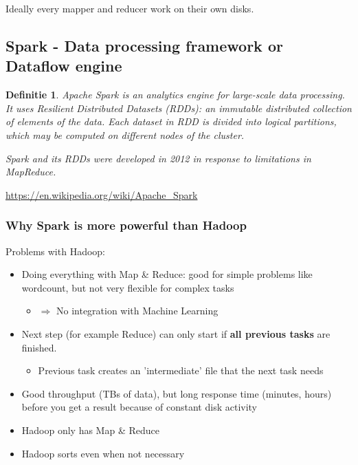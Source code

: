 \documentclass{article}
\newtheorem{theorem}{Definitie}[section]
\begin{document}
Ideally every mapper and reducer work on their own disks.

\subsection{Spark - Data processing framework or Dataflow engine}

\begin{theorem}
    Apache Spark is an analytics engine for large-scale data processing. 
    It uses Resilient Distributed Datasets (RDDs): an immutable
    distributed collection of elements of the data. 
    Each dataset in RDD is divided into logical partitions, 
    which may be computed on different nodes of the cluster.
    
    Spark and its RDDs were developed in 2012 in response to limitations in MapReduce.
\end{theorem}

\url{https://en.wikipedia.org/wiki/Apache_Spark}

\subsubsection{Why Spark is more powerful than Hadoop}

Problems with Hadoop:

\begin{itemize}
    \item Doing everything with Map \& Reduce: good for simple problems like wordcount, but not very flexible for complex tasks
    \begin{itemize}
        \item $\Rightarrow$ No integration with Machine Learning
    \end{itemize}
    \item Next step (for example Reduce) can only start if \textbf{all previous tasks} are finished. 
    \begin{itemize}
        \item Previous task creates an 'intermediate' file that the next task needs
    \end{itemize}
    \item Good throughput (TBs of data), but long response time (minutes, hours) before you get a result because of constant disk activity
    \item Hadoop only has Map \& Reduce
    \item Hadoop sorts even when not necessary
\end{itemize}
    
\end{document}
